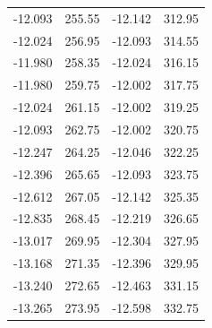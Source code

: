\begin{table}[H]
\begin{tabular}{S S S S}
    -12.093 & 255.55 & -12.142 & 312.95 \\
    -12.024 & 256.95 & -12.093 & 314.55 \\
    -11.980 & 258.35 & -12.024 & 316.15 \\
    -11.980 & 259.75 & -12.002 & 317.75 \\
    -12.024 & 261.15 & -12.002 & 319.25 \\
    -12.093 & 262.75 & -12.002 & 320.75 \\
    -12.247 & 264.25 & -12.046 & 322.25 \\
    -12.396 & 265.65 & -12.093 & 323.75 \\
    -12.612 & 267.05 & -12.142 & 325.35 \\
    -12.835 & 268.45 & -12.219 & 326.65 \\
    -13.017 & 269.95 & -12.304 & 327.95 \\
    -13.168 & 271.35 & -12.396 & 329.95 \\
    -13.240 & 272.65 & -12.463 & 331.15 \\
    -13.265 & 273.95 & -12.598 & 332.75 \\
    \bottomrule
  \end{tabular}
\end{table}

